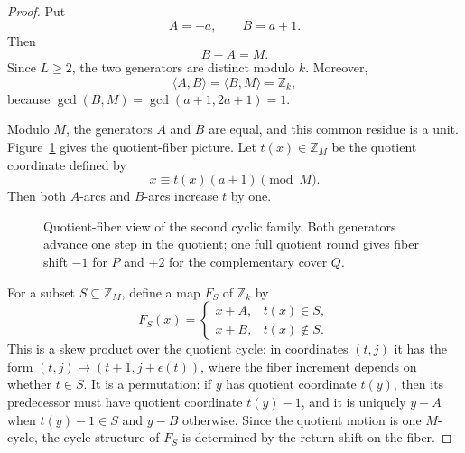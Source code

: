 \documentclass[11pt]{article}
\newcommand{\Z}{\mathbb Z}
\begin{document}
\begin{proof}
Put
\[
        A=-a,
        \qquad
        B=a+1.
\]
Then
\[
        B-A=M.
\]
Since $L\ge2$, the two generators are distinct modulo $k$.  Moreover,
\[
        \langle A,B\rangle=\langle B,M\rangle=\Z_k,
\]
because $\gcd(B,M)=\gcd(a+1,2a+1)=1$.

Modulo $M$, the generators $A$ and $B$ are equal, and this common residue is a unit.  Figure~\ref{fig:quotient-fiber} gives the quotient-fiber picture.  Let $t(x)\in\Z_M$ be the quotient coordinate defined by
\[
        x\equiv t(x)(a+1)\pmod M.
\]
Then both $A$-arcs and $B$-arcs increase $t$ by one.

\begin{figure}[H]
\centering
{}
\caption{Quotient-fiber view of the second cyclic family.  Both generators advance one step in the quotient; one full quotient round gives fiber shift $-1$ for $P$ and $+2$ for the complementary cover $Q$.}
\label{fig:quotient-fiber}
\end{figure}

For a subset $S\subseteq\Z_M$, define a map $F_S$ of $\Z_k$ by
\[
F_S(x)=
\begin{cases}
        x+A, & t(x)\in S,\\
        x+B, & t(x)\notin S.
\end{cases}
\]
This is a skew product over the quotient cycle: in coordinates $(t,j)$ it has the form $(t,j)\mapsto(t+1,j+\epsilon(t))$, where the fiber increment depends on whether $t\in S$.  It is a permutation: if $y$ has quotient coordinate $t(y)$, then its predecessor must have quotient coordinate $t(y)-1$, and it is uniquely $y-A$ when $t(y)-1\in S$ and $y-B$ otherwise.  Since the quotient motion is one $M$-cycle, the cycle structure of $F_S$ is determined by the return shift on the fiber.



\end{proof}
\end{document}
